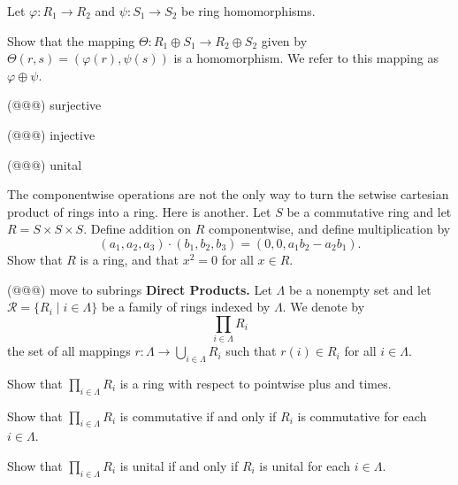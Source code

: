 \begin{exercise}
Let \(\varphi : R_1 \rightarrow R_2\) and \(\psi : S_1 \rightarrow S_2\) be ring homomorphisms.
\begin{proplist}
\item Show that the mapping \(\Theta : R_1 \oplus S_1 \rightarrow R_2 \oplus S_2\) given by \(\Theta(r,s) = (\varphi(r), \psi(s))\) is a homomorphism. We refer to this mapping as \(\varphi \oplus \psi\).
\item (@@@) surjective
\item (@@@) injective
\item (@@@) unital
\end{proplist}
\end{exercise}

\begin{exercise}
The componentwise operations are not the only way to turn the setwise cartesian product of rings into a ring. Here is another. Let \(S\) be a commutative ring and let \(R = S \times S \times S\). Define addition on \(R\) componentwise, and define multiplication by \[ (a_1,a_2,a_3) \cdot (b_1,b_2,b_3) = (0,0,a_1b_2 - a_2b_1). \] Show that \(R\) is a ring, and that \(x^2 = 0\) for all \(x \in R\).
\end{exercise}

\begin{exercise}
(@@@) move to subrings \textbf{Direct Products.} Let \(\Lambda\) be a nonempty set and let \(\mathcal{R} = \{ R_i \mid i \in \Lambda \}\) be a family of rings indexed by \(\Lambda\). We denote by \[ \prod_{i \in \Lambda} R_i \] the set of all mappings \(r : \Lambda \rightarrow \bigcup_{i \in \Lambda} R_i\) such that \(r(i) \in R_i\) for all \(i \in \Lambda\).
\begin{proplist}
\item Show that \(\prod_{i \in \Lambda} R_i\) is a ring with respect to pointwise plus and times.
\item Show that \(\prod_{i \in \Lambda} R_i\) is commutative if and only if \(R_i\) is commutative for each \(i \in \Lambda\).
\item Show that \(\prod_{i \in \Lambda} R_i\) is unital if and only if \(R_i\) is unital for each \(i \in \Lambda\).
\end{proplist}
\end{exercise}


